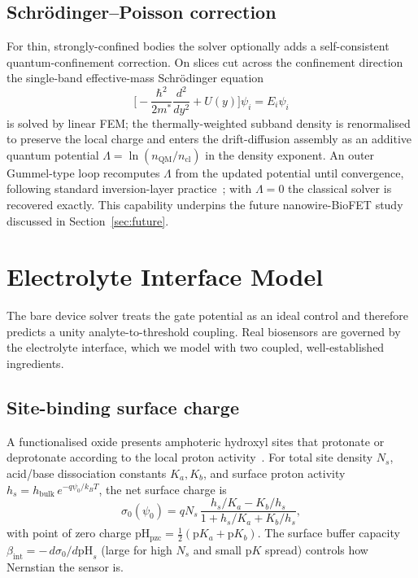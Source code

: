 \documentclass[10pt,journal]{IEEEtran}
\begin{document}
\subsection{Schr\"odinger--Poisson correction}
For thin, strongly-confined bodies the solver optionally adds a self-consistent
quantum-confinement correction. On slices cut across the confinement direction the
single-band effective-mass Schr\"odinger equation
\begin{equation}
  \Big[-\frac{\hbar^2}{2m^*}\frac{d^2}{dy^2}+U(y)\Big]\psi_i=E_i\psi_i
  \label{eq:schrod}
\end{equation}
is solved by linear FEM; the thermally-weighted subband density is renormalised to
preserve the local charge and enters the drift-diffusion assembly as an additive
quantum potential $\Lambda=\ln(n_{\mathrm{QM}}/n_{\mathrm{cl}})$ in the density
exponent. An outer Gummel-type loop recomputes $\Lambda$ from the updated
potential until convergence, following standard inversion-layer
practice~\cite{stern1972,ando1982,trellakis1997,ancona1987}; with $\Lambda=0$ the
classical solver is recovered exactly. This capability underpins the future
nanowire-BioFET study discussed in Section~\ref{sec:future}.

\section{Electrolyte Interface Model}
\label{sec:gdl}

The bare device solver treats the gate potential as an ideal control and
therefore predicts a unity analyte-to-threshold coupling. Real biosensors are
governed by the electrolyte interface, which we model with two coupled,
well-established ingredients.

\subsection{Site-binding surface charge}
A functionalised oxide presents amphoteric hydroxyl sites that protonate or
deprotonate according to the local proton activity~\cite{yates1974,fung1986}. For
total site density $N_s$, acid/base dissociation constants $K_a,K_b$, and surface
proton activity $h_s=h_{\mathrm{bulk}}\,e^{-q\psi_0/k_BT}$, the net surface charge
is
\begin{equation}
  \sigma_0(\psi_0)=qN_s\,
  \frac{h_s/K_a-K_b/h_s}{1+h_s/K_a+K_b/h_s},
  \label{eq:site}
\end{equation}
with point of zero charge $\mathrm{pH_{pzc}}=\tfrac12(\mathrm{p}K_a+\mathrm{p}K_b)$.
The surface buffer capacity $\beta_{\mathrm{int}}=-\,d\sigma_0/d\mathrm{pH}_s$
(large for high $N_s$ and small p$K$ spread) controls how Nernstian the sensor is.
\end{document}
